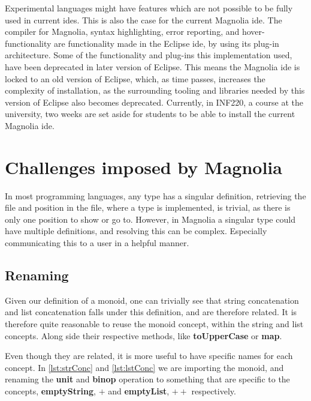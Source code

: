 Experimental languages might have features which are not possible to be fully
used in current \gls*{ide}s. This is also the case for the current Magnolia
\gls*{ide}. The compiler for Magnolia, syntax highlighting, error reporting, and
hover-functionality are functionality made in the Eclipse \gls*{ide}, by using
its plug-in architecture. Some of the functionality and plug-ins this
implementation used, have been deprecated in later version of Eclipse. This
means the Magnolia \gls*{ide} is locked to an old version of Eclipse, which, as
time passes, increases the complexity of installation, as the surrounding
tooling and libraries needed by this version of Eclipse also becomes deprecated.
Currently, in INF220, a course at the university, two weeks are set aside for
students to be able to install the current Magnolia \gls*{ide}.


\section{Challenges imposed by Magnolia}

In most programming languages, any type has a singular definition, retrieving
the file and position in the file, where a type is implemented, is trivial, as
there is only one position to show or go to. However, in Magnolia a singular
type could have multiple definitions, and resolving this can be complex.
Especially communicating this to a user in a helpful manner.


\subsection{Renaming}

Given our definition of a monoid\footnotemark[12]{}, one can trivially see that
string concatenation and list concatenation falls under this definition, and are
therefore related. It is therefore quite reasonable to reuse the monoid
concept, within the string and list concepts. Along side their respective
methods, like \textbf{toUpperCase} or \textbf{map}.

Even though they are related, it is more useful to have specific names for each
concept. In \ref{lst:strConc} and \ref{lst:lstConc} we are importing the
monoid\footnotemark{}, and renaming the \textbf{unit} and \textbf{binop}
operation to something that are specific to the concepts, \textbf{emptyString},
$+$ and \textbf{emptyList}, $++$ respectively.


